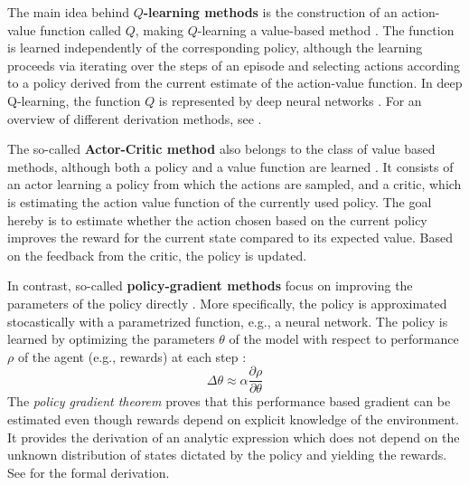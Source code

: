 The main idea behind \textbf{$Q$-learning methods} is the construction of an action-value function called $Q$, making $Q$-learning a value-based method \parencite{sutton2018reinforcement}. The function is learned independently of the corresponding policy, although the learning proceeds via iterating over the steps of an episode and selecting actions according to a policy derived from the current estimate of the action-value function. In deep Q-learning, the function $Q$ is represented by deep neural networks \parencite[e.g.,][]{hester2018deep}. For an overview of different derivation methods, see \cite{sutton2018reinforcement}. 

The so-called \textbf{Actor-Critic method} also belongs to the class of value based methods, although both a policy and a value function are learned \parencite{sutton2018reinforcement}. It consists of an actor learning a policy from which the actions are sampled, and a critic, which is estimating the action value function of the currently used policy. The goal hereby is to estimate whether the action chosen based on the current policy improves the reward for the current state compared to its expected value. Based on the feedback from the critic, the policy is updated. 

In contrast, so-called \textbf{policy-gradient methods} focus on improving the parameters of the policy directly \parencite{sutton2018reinforcement, sutton1999policy, williams1992simple}. %
More specifically, the policy is approximated stocastically with a parametrized function, e.g., a neural network. The policy is learned by optimizing the parameters $\theta$ of the model with respect to performance $\rho$ of the agent (e.g., rewards) at each step \parencite[][p. 1058]{sutton1999policy}: 
\begin{equation}
\Delta \theta \approx \alpha \frac{\partial \rho}{\partial \theta} 
\end{equation}
The \textit{policy gradient theorem} proves that this performance based gradient can be estimated even though rewards depend on explicit knowledge of the environment. It provides the derivation of an analytic expression which does not depend on the unknown distribution of states dictated by the policy and yielding the rewards. See \cite[][p. 326f.]{sutton2018reinforcement} for the formal derivation.

